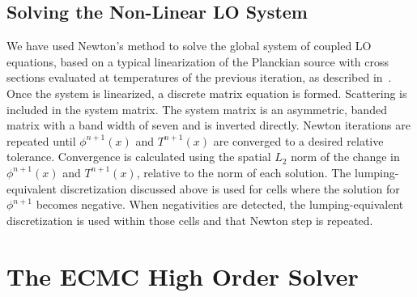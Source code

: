 \documentclass[12pt]{article}
\begin{document}
\begin{center}
\subsection{Solving the Non-Linear LO System}

We have used Newton's method to solve the global system of coupled LO
equations, based on a typical linearization of the Planckian source with cross
sections evaluated at temperatures of the previous iteration, as described in~\cite{morel_newton}.  
Once the system is linearized, a discrete matrix equation is formed.  Scattering is included in the system matrix. The system
matrix is an asymmetric, banded matrix with a band width of seven and is inverted
directly. 
Newton iterations are repeated until $\phi^{n+1}(x)$ and $T^{n+1}(x)$ are converged
to a desired relative tolerance.  Convergence is calculated using the spatial $L_2$
norm of the change in $\phi^{n+1}(x)$ and $T^{n+1}(x)$, relative to the norm of each
solution.  The lumping-equivalent discretization
discussed above is used for cells where the solution for
$\phi^{n+1}$ becomes negative. When negativities are detected, the lumping-equivalent discretization is used within
those cells and that Newton step is repeated. 

\section{The ECMC High Order Solver}


\end{center}
\end{document}

